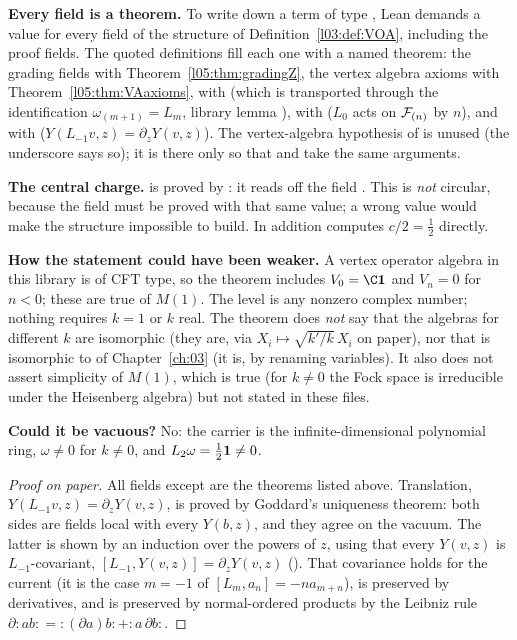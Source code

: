 \begin{dictionary}
\textbf{Every field is a theorem.} To write down a term of type , Lean demands
a value for every field of the structure of Definition~\ref{l03:def:VOA}, including the proof fields. The
quoted definitions fill each one with a named theorem: the grading fields with
Theorem~\ref{l05:thm:gradingZ}, the vertex algebra axioms with Theorem~\ref{l05:thm:VAaxioms}, 
with  (which is  transported through the identification
$\omega_{(m+1)}=L_m$, library lemma ),  with
 ($L_0$ acts on $\mathcal{F}_{(n)}$ by $n$), and  with
 ($Y(L_{-1}v,z)=\partial_zY(v,z)$). The vertex-algebra hypothesis  of
 is unused (the underscore says so); it is there only so that  and
 take the same arguments.

\textbf{The central charge.}  is proved by : it reads off the field
. This is \emph{not} circular, because the field  must be proved with
that same value; a wrong value would make the structure impossible to build. In addition
 computes $c/2=\frac12$ directly.

\textbf{How the statement could have been weaker.} A vertex operator algebra in this library is of CFT
type, so the theorem includes $V_0=\C\lfivevac$ and $V_n=0$ for $n<0$; these are true of $M(1)$. The level is
any nonzero complex number; nothing requires $k=1$ or $k$ real. The theorem does \emph{not} say that the
algebras for different $k$ are isomorphic (they are, via $X_i\mapsto\sqrt{k'/k}\,X_i$ on paper), nor that
 is isomorphic to  of Chapter~\ref{ch:03} (it is, by
renaming variables). It also does not assert simplicity of $M(1)$, which is true (for $k\ne0$ the Fock space
is irreducible under the Heisenberg algebra) but not stated in these files.

\textbf{Could it be vacuous?} No: the carrier is the infinite-dimensional polynomial ring, $\omega\neq0$ for
$k\ne0$, and $L_2\omega=\frac12\mathbf{1}\ne0$.
\end{dictionary}

\begin{proof}[Proof on paper]
All fields except  are the theorems listed above. Translation, $Y(L_{-1}v,z)=\partial_zY(v,z)$, is
proved by Goddard's uniqueness theorem: both sides are fields local with every $Y(b,z)$, and they agree on the
vacuum. The latter is shown by an induction over the powers of $z$, using that every $Y(v,z)$ is
$L_{-1}$-covariant, $[L_{-1},Y(v,z)]=\partial_zY(v,z)$ (). That covariance holds for the
current (it is the case $m=-1$ of $[L_m,a_n]=-na_{m+n}$), is preserved by derivatives, and is preserved by
normal-ordered products by the Leibniz rule $\partial{:}ab{:}={:}(\partial a)b{:}+{:}a\,\partial b{:}$.
\end{proof}

